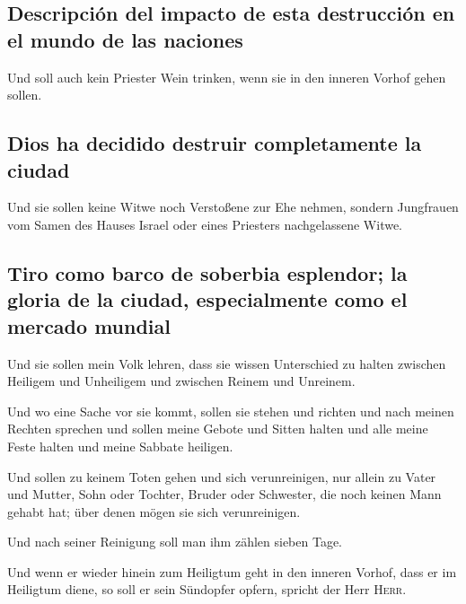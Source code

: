 \hypertarget{descripciuxf3n-del-impacto-de-esta-destrucciuxf3n-en-el-mundo-de-las-naciones}{%
\subsection{Descripción del impacto de esta destrucción en el mundo de
las
naciones}\label{descripciuxf3n-del-impacto-de-esta-destrucciuxf3n-en-el-mundo-de-las-naciones}}

 Und soll auch kein Priester Wein trinken, wenn sie in
den inneren Vorhof gehen sollen.

\hypertarget{dios-ha-decidido-destruir-completamente-la-ciudad}{%
\subsection{Dios ha decidido destruir completamente la
ciudad}\label{dios-ha-decidido-destruir-completamente-la-ciudad}}

 Und sie sollen keine Witwe noch Verstoßene zur Ehe
nehmen, sondern Jungfrauen vom Samen des Hauses Israel oder eines
Priesters nachgelassene Witwe.

\hypertarget{tiro-como-barco-de-soberbia-esplendor-la-gloria-de-la-ciudad-especialmente-como-el-mercado-mundial}{%
\subsection{Tiro como barco de soberbia esplendor; la gloria de la
ciudad, especialmente como el mercado
mundial}\label{tiro-como-barco-de-soberbia-esplendor-la-gloria-de-la-ciudad-especialmente-como-el-mercado-mundial}}

 Und sie sollen mein Volk lehren, dass sie wissen
Unterschied zu halten zwischen Heiligem und Unheiligem und zwischen
Reinem und Unreinem.

 Und wo eine Sache vor sie kommt, sollen sie stehen und
richten und nach meinen Rechten sprechen und sollen meine Gebote und
Sitten halten und alle meine Feste halten und meine Sabbate heiligen.

 Und sollen zu keinem Toten gehen und sich verunreinigen,
nur allein zu Vater und Mutter, Sohn oder Tochter, Bruder oder
Schwester, die noch keinen Mann gehabt hat; über denen mögen sie sich
verunreinigen.

 Und nach seiner Reinigung soll man ihm zählen sieben
Tage.

 Und wenn er wieder hinein zum Heiligtum geht in den
inneren Vorhof, dass er im Heiligtum diene, so soll er sein Sündopfer
opfern, spricht der Herr \textsc{Herr}.

